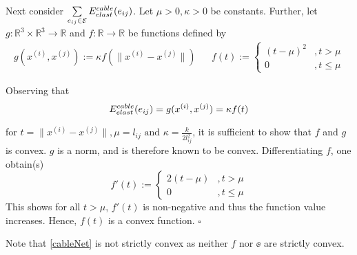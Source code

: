 Next consider $\sum\limits_{e_{ij} \in \mathcal{E}} E^{cable}_{elast}(e_{ij})$. Let $\mu > 0, \kappa > 0$  be constants. Further, let $g: \mathbb{R}^3 \times \mathbb{R}^3 \rightarrow \mathbb{R}$ and $f: \mathbb{R} \rightarrow \mathbb{R}$ be functions defined by 
\begin{align*}
    g(x^{(i)},x^{(j)}) := \kappa f(\|x^{(i)} - x^{(j)}\|) && 
    f(t) := \begin{cases}
            (t - \mu)^2  & , t > \mu \\
            0           & , t \leq \mu
            \end{cases}
\end{align*}

Observing that 
\begin{equation*}
    E^{cable}_{elast}(e_{ij}) = g(x^{(i)}, x^{(j)}) = \kappa f(t)   
\end{equation*} 

for $t = \|x^{(i)} - x^{(j)}\|, \mu = l_{ij} \text{ and } \kappa = \frac{k}{2l^2_{ij}}$, it is sufficient to show that $f$ and $g$ is convex. $g$ is a norm, and is therefore known to be convex. Differentiating $f$, one obtain(s)
$$
f'(t) := \begin{cases}
        2(t-\mu) &, t > \mu \\
        0       &, t \leq \mu
        \end{cases}
$$ 
This shows for all $t > \mu$, $f'(t)$ is non-negative and thus the function value increases. Hence, $f(t)$ is a convex function. \hfill $\square$




Note that \eqref{cableNet} is not strictly convex as neither $f$ nor $\ee$ are strictly convex.



